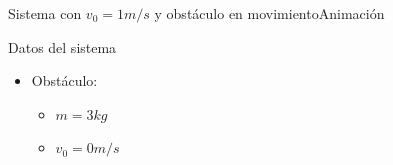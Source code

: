 \documentclass{beamer}
\begin{document}
\begin{frame}{Sistema con $v_0=1m/s$ y obstáculo en movimiento}{Animación}
\begin{minipage}[t]{0.30\textwidth}
\begin{block}{Datos del sistema}
\begin{itemize}
\begin{itemize}
                                \item $v_0 = 1 m/s$
                            \end{itemize}
                            \item Obstáculo:
                            \begin{itemize}
                                \item $m = 3 kg$
                                \item $v_0 = 0 m/s$
                            \end{itemize}
                        \end{itemize}
                    \end{block}
                \end{minipage}
            \end{frame}
\end{document}
